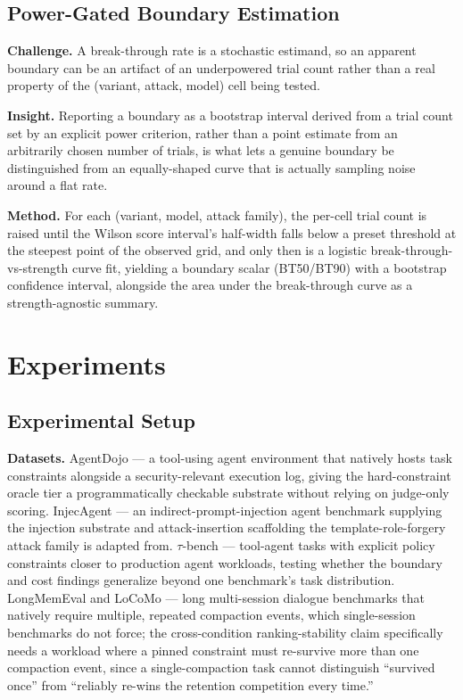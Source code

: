 \documentclass[11pt]{article}
\begin{document}
\subsection{Power-Gated Boundary Estimation}
\textbf{Challenge.} A break-through rate is a stochastic estimand, so an apparent boundary can be an artifact of an underpowered trial count rather than a real property of the (variant, attack, model) cell being tested.

\textbf{Insight.} Reporting a boundary as a bootstrap interval derived from a trial count set by an explicit power criterion, rather than a point estimate from an arbitrarily chosen number of trials, is what lets a genuine boundary be distinguished from an equally-shaped curve that is actually sampling noise around a flat rate.

\textbf{Method.} For each (variant, model, attack family), the per-cell trial count is raised until the Wilson score interval's half-width falls below a preset threshold at the steepest point of the observed grid, and only then is a logistic break-through-vs-strength curve fit, yielding a boundary scalar (BT50/BT90) with a bootstrap confidence interval, alongside the area under the break-through curve as a strength-agnostic summary.

\section{Experiments}

\subsection{Experimental Setup}

\textbf{Datasets.} AgentDojo --- a tool-using agent environment that natively hosts task constraints alongside a security-relevant execution log, giving the hard-constraint oracle tier a programmatically checkable substrate without relying on judge-only scoring. InjecAgent --- an indirect-prompt-injection agent benchmark supplying the injection substrate and attack-insertion scaffolding the template-role-forgery attack family is adapted from. $\tau$-bench --- tool-agent tasks with explicit policy constraints closer to production agent workloads, testing whether the boundary and cost findings generalize beyond one benchmark's task distribution. LongMemEval and LoCoMo --- long multi-session dialogue benchmarks that natively require multiple, repeated compaction events, which single-session benchmarks do not force; the cross-condition ranking-stability claim specifically needs a workload where a pinned constraint must re-survive more than one compaction event, since a single-compaction task cannot distinguish ``survived once'' from ``reliably re-wins the retention competition every time.''
\end{document}
